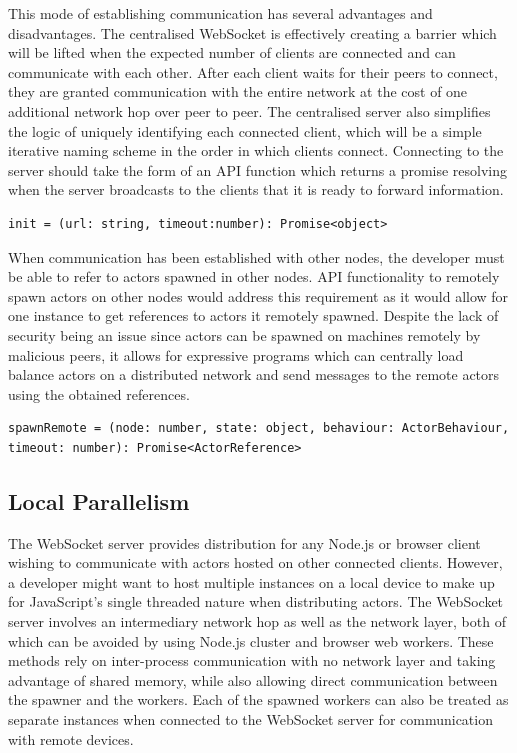 \documentclass[12pt, a4paper]{report}
\theoremstyle{definition}
\theoremstyle{definition}%
\theoremstyle{definition}%
\theoremstyle{definition}%
\theoremstyle{definition}%
\theoremstyle{definition}%
\begin{document}
This mode of establishing communication has several advantages and disadvantages. The centralised WebSocket is effectively creating a barrier which will be lifted when the expected number of clients are connected and can communicate with each other. After each client waits for their peers to connect, they are granted communication with the entire network at the cost of one additional network hop over peer to peer. The centralised server also simplifies the logic of uniquely identifying each connected client, which will be a simple iterative naming scheme in the order in which clients connect. Connecting to the server should take the form of an API function which returns a promise resolving when the server broadcasts to the clients that it is ready to forward information.
\begin{lstlisting}
init = (url: string, timeout:number): Promise<object>
\end{lstlisting}
When communication has been established with other nodes, the developer must be able to refer to actors spawned in other nodes. API functionality to remotely spawn actors on other nodes would address this requirement as it would allow for one instance to get references to actors it remotely spawned. Despite the lack of security being an issue since actors can be spawned on machines remotely by malicious peers, it allows for expressive programs which can centrally load balance actors on a distributed network and send messages to the remote actors using the obtained references.
\begin{lstlisting}
spawnRemote = (node: number, state: object, behaviour: ActorBehaviour, timeout: number): Promise<ActorReference>
\end{lstlisting}
\subsection{Local Parallelism}
The WebSocket server provides distribution for any Node.js or browser client wishing to communicate with actors hosted on other connected clients. However, a developer might want to host multiple instances on a local device to make up for JavaScript’s single threaded nature when distributing actors. The WebSocket server involves an intermediary network hop as well as the network layer, both of which can be avoided by using Node.js cluster and browser web workers. These methods rely on inter-process communication with no network layer and taking advantage of shared memory, while also allowing direct communication between the spawner and the workers. Each of the spawned workers can also be treated as separate instances when connected to the WebSocket server for communication with remote devices.
\end{document}
